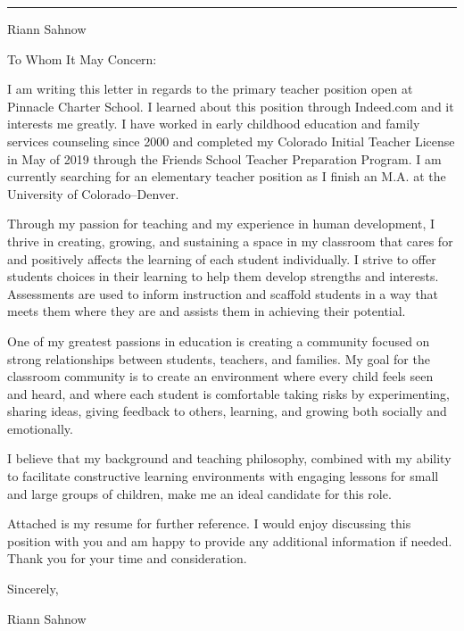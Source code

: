 \documentclass[letterpaper,10pt]{article}
\newcommand{\mblue}{\color{darkblue}}
\begin{document}
\pagestyle{empty}

{\mblue\rule{4.63in}{0.08cm}}

\vspace{-1.0pc}
\hfill{\Huge\mblue Riann Sahnow}

\vspace{2pc}
To Whom It May Concern:

\bigbreak\qquad I am writing this letter in regards to the primary teacher
position open at Pinnacle Charter School. I learned about this position through
Indeed.com and it interests me greatly. I have worked in early childhood
education and family services counseling since 2000 and completed
my Colorado Initial Teacher License in May of 2019 through the Friends School Teacher Preparation
Program. I am currently searching for an elementary teacher position as I finish
an M.A. at the University of Colorado--Denver.

\bigbreak\qquad Through my passion for teaching and my experience in
human development, I thrive in creating, growing, and sustaining a space in
my classroom that cares for and positively affects the learning of each student
individually. I strive to offer students choices in their learning to help them
develop strengths and interests. Assessments are used to inform instruction and
scaffold students in a way that meets them where they are and assists them in
achieving their potential.

\bigbreak\qquad One of my greatest passions in education is creating
a community focused on strong relationships between students, teachers, and
families. My goal for the classroom community is to create an environment
where every child feels seen and heard, and where each student is comfortable
taking risks by experimenting, sharing ideas, giving feedback to others, learning,
and growing both socially and emotionally.


\bigbreak\qquad I believe that my background and teaching philosophy, combined
with my ability to facilitate constructive learning environments with engaging
lessons for small and large groups of children, make me an ideal candidate for
this role.

\bigbreak\qquad Attached is my resume for further reference. I would enjoy
discussing this position with you and am happy to provide any additional
information if needed. Thank you for your time and consideration.

\bigbreak Sincerely,

\vspace{2pc} Riann Sahnow
\end{document}
